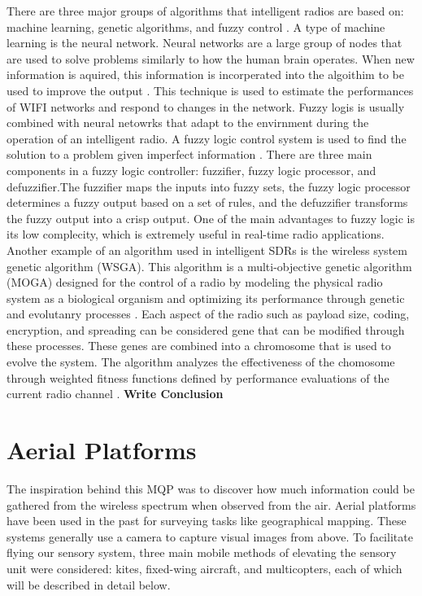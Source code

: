 There are three major groups of algorithms that intelligent radios are based on: machine learning, genetic algorithms, and fuzzy control \cite{amraoui2012intelligent}. A type of machine learning is the neural network. Neural networks are a large group of nodes that are used to solve problems similarly to how the human brain operates. When new information is aquired, this information is incorperated into the algoithim to be used to improve the output \cite{amini2011universal}. This technique is used to estimate the performances of WIFI networks and respond to changes in the network. Fuzzy logis is usually combined with neural netowrks that adapt to the envirnment during the operation of an intelligent radio. A fuzzy logic control system is used to find the solution to a problem given imperfect information \cite{amraoui2012intelligent}. There are three main components in a fuzzy logic controller: fuzzifier, fuzzy logic processor, and defuzzifier.The fuzzifier maps the inputs into fuzzy sets, the fuzzy logic processor determines a fuzzy output based on a set of rules, and the defuzzifier transforms the fuzzy output into a crisp output. One of the main advantages to fuzzy logic is its low complecity, which is extremely useful in real-time radio applications. Another example of an algorithm used in intelligent SDRs is the wireless system genetic algorithm (WSGA). This algorithm is a multi-objective genetic algorithm (MOGA) designed for the control of a radio by modeling the physical radio system as a biological organism and optimizing its performance through genetic and evolutanry processes \cite{rondeau2004cognitive}. Each aspect of the radio such as payload size, coding, encryption, and spreading can be considered gene that can be modified through these processes. These genes are combined into a chromosome that is used to evolve the system. The algorithm analyzes the effectiveness of the chomosome through weighted fitness functions defined by performance evaluations of the current radio channel \cite{rondeau2004cognitive}. 
\textbf{Write Conclusion}

\section{Aerial Platforms}
The inspiration behind this MQP was to discover how much information could be gathered from the wireless spectrum when observed from the air. Aerial platforms have been used in the past for surveying tasks like geographical mapping. \cite{geomap_patent} These systems generally use a camera to capture visual images from above. To facilitate flying our sensory system, three main mobile methods of elevating the sensory unit were considered: kites, fixed-wing aircraft, and multicopters, each of which will be described in detail below.

